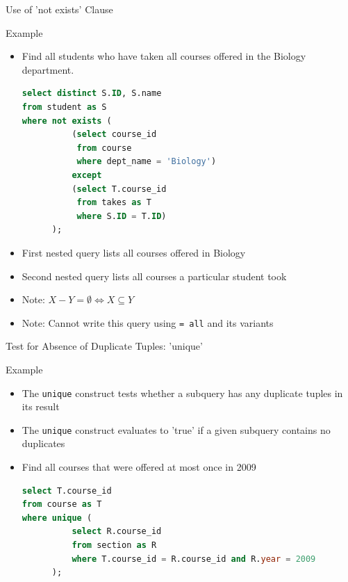 \documentclass[aspectratio=169, xcolor=dvipsnames]{beamer}
\begin{document}
\begin{frame}[fragile]{Use of 'not exists' Clause}
    \begin{exampleblock}{Example}
        \begin{itemize}[<+->]
            \item Find all students who have taken all courses offered in the Biology department.
            \begin{lstlisting}[language=SQL, basicstyle=\ttfamily\scriptsize]
select distinct S.ID, S.name 
from student as S 
where not exists ( 
          (select course_id 
           from course 
           where dept_name = 'Biology') 
          except 
          (select T.course_id 
           from takes as T 
           where S.ID = T.ID) 
      );
            \end{lstlisting}
            \item First nested query lists all courses offered in Biology
            \item Second nested query lists all courses a particular student took
            \item Note: $X - Y = \emptyset \Leftrightarrow X \subseteq Y$
            \item Note: Cannot write this query using \texttt{= all} and its variants
        \end{itemize}
    \end{exampleblock}
\end{frame}

\begin{frame}[fragile]{Test for Absence of Duplicate Tuples: 'unique'}
    \begin{exampleblock}{Example}
        \begin{itemize}[<+->]
            \item The \texttt{unique} construct tests whether a subquery has any duplicate tuples in its result
            \item The \texttt{unique} construct evaluates to 'true' if a given subquery contains no duplicates
            \item Find all courses that were offered at most once in 2009
            \begin{lstlisting}[language=SQL, basicstyle=\ttfamily\scriptsize]
select T.course_id 
from course as T 
where unique ( 
          select R.course_id 
          from section as R 
          where T.course_id = R.course_id and R.year = 2009 
      );
            \end{lstlisting}
        \end{itemize}
    \end{exampleblock}
\end{frame}
\end{document}
